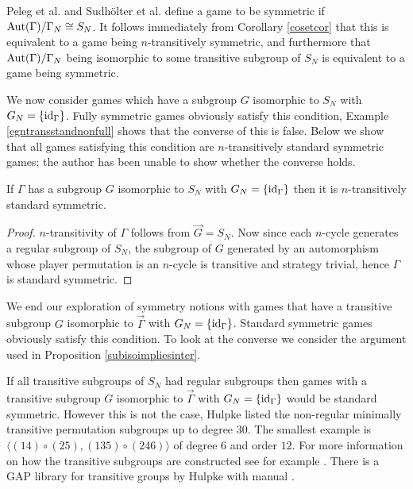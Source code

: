 Peleg et al. \cite{peleg1999canonical} and Sudh\"{o}lter et al. \cite{sudholter2000canonical} define a game to be symmetric if $\operatorname*{Aut}(\Gamma)/\Gamma_N \cong S_N$. It follows immediately from Corollary \ref{cosetcor} that this is equivalent to a game being $n$-transitively symmetric, and furthermore that $\operatorname*{Aut}(\Gamma)/\Gamma_N$ being isomorphic to some transitive subgroup of $S_N$ is equivalent to a game being symmetric.

We now consider games which have a subgroup $G$ isomorphic to $S_N$ with $G_N = \{\text{id}_{\Gamma}\}$. Fully symmetric games obviously satisfy this condition, Example \ref{egntransstandnonfull} shows that the converse of this is false. Below we show that all games satisfying this condition are $n$-transitively standard symmetric games; the author has been unable to show whether the converse holds.

\begin{proposition} \label{subisoimpliesinter}
	If $\Gamma$ has a subgroup $G$ isomorphic to $S_N$ with $G_N = \{\text{id}_{\Gamma}\}$ then it is $n$-transitively standard symmetric. 
	\begin{proof}
		$n$-transitivity of $\Gamma$ follows from $\overrightarrow{G} = S_N$. Now since each $n$-cycle generates a regular subgroup of $S_N$, the subgroup of $G$ generated by an automorphism whose player permutation is an $n$-cycle is transitive and strategy trivial, hence $\Gamma$ is standard symmetric.
	\end{proof}
\end{proposition}

We end our exploration of symmetry notions with games that have a transitive subgroup $G$ isomorphic to $\overrightarrow{\Gamma}$ with $G_N = \{\text{id}_{\Gamma}\}$. Standard symmetric games obviously satisfy this condition. To look at the converse we consider the argument used in Proposition \ref{subisoimpliesinter}. 

If all transitive subgroups of $S_N$ had regular subgroups then games with a transitive subgroup $G$ isomorphic to $\overrightarrow{\Gamma}$ with $G_N = \{\text{id}_{\Gamma}\}$ would be standard symmetric. However this is not the case, Hulpke \cite{hulpke2005constructing} listed the non-regular minimally transitive permutation subgroups up to degree $30$. The smallest example is $\langle (14) \circ (25), (135) \circ (246)\rangle$ of degree $6$ and order $12$. For more information on how the transitive subgroups are constructed see for example \cite[Algorithm 8.1]{hulpke2016connected}. There is a GAP \cite{GAP4} library for transitive groups by Hulpke with manual \cite{hulpketransgrp}.

